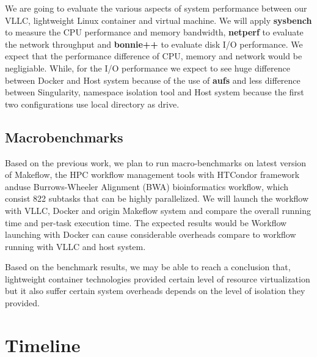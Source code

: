 \documentclass{article}
\begin{document}
We are going to evaluate the various aspects of system performance between our VLLC, 
lightweight Linux container and virtual machine. We will apply \textbf{sysbench} to measure the CPU 
performance and memory bandwidth, \textbf{netperf} to evaluate the network throughput and \textbf{bonnie++} 
to evaluate disk I/O performance. We expect that the performance difference of CPU, memory and network would 
be negligiable. While, for the I/O performance we expect to see huge difference between Docker and Host 
system because of the use of \textbf{aufs} and less difference between Singularity, namespace isolation tool and
Host system because the first two configurations use local directory as drive.

\subsection{Macrobenchmarks}

Based on the previous work\cite{zheng2015integrating}, we plan to run macro-benchmarks on latest version of Makeflow, 
the HPC workflow management tools with HTCondor framework anduse Burrows-Wheeler Alignment (BWA) 
bioinformatics workflow, which consist 822 subtasks that can be highly parallelized. We will launch 
the workflow with VLLC, Docker and origin Makeflow system and compare the overall running time and per-task execution time.
The expected results would be Workflow launching with Docker can cause considerable overheads compare to workflow
running with VLLC and host system.

\medskip

Based on the benchmark results, we may be able to reach a conclusion that, lightweight container technologies 
provided certain level of resource virtualization but it also suffer certain system overheads depends on the level
of isolation they provided.

\section{Timeline}






\end{document}
